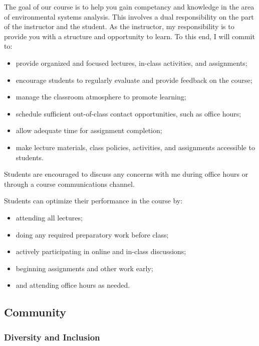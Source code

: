 \documentclass[
  letterpaper,
  DIV=11,
  numbers=noendperiod]{scrartcl}
\providecommand{\tightlist}{%
  \setlength{\itemsep}{0pt}\setlength{\parskip}{0pt}}\usepackage{longtable,booktabs,array}
\begin{document}
The goal of our course is to help you gain competancy and knowledge in
the area of environmental systems analysis. This involves a dual
responsibility on the part of the instructor and the student. As the
instructor, my responsibility is to provide you with a structure and
opportunity to learn. To this end, I will commit to:

\begin{itemize}
\tightlist
\item
  provide organized and focused lectures, in-class activities, and
  assignments;
\item
  encourage students to regularly evaluate and provide feedback on the
  course;
\item
  manage the classroom atmosphere to promote learning;
\item
  schedule sufficient out-of-class contact opportunities, such as office
  hours;
\item
  allow adequate time for assignment completion;
\item
  make lecture materials, class policies, activities, and assignments
  accessible to students.
\end{itemize}

Students are encouraged to discuss any concerns with me during office
hours or through a course communications channel.

Students can optimize their performance in the course by:

\begin{itemize}
\tightlist
\item
  attending all lectures;
\item
  doing any required preparatory work before class;
\item
  actively participating in online and in-class discussions;
\item
  beginning assignments and other work early;
\item
  and attending office hours as needed.
\end{itemize}

\hypertarget{community}{%
\subsection{Community}\label{community}}

\hypertarget{diversity-and-inclusion}{%
\subsubsection{Diversity and Inclusion}\label{diversity-and-inclusion}}
\end{document}
